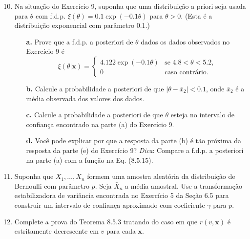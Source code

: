 \begin{enumerate}
    \setcounter{enumi}{9} %
    \item Na situação do Exercício 9, suponha que uma distribuição a priori seja usada para $\theta$ com f.d.p. $\xi(\theta) = 0.1 \exp(-0.1\theta)$ para $\theta > 0$. (Esta é a distribuição exponencial com parâmetro 0.1.)
    \begin{enumerate}
        \item[\textbf{a.}] Prove que a f.d.p. a posteriori de $\theta$ dados os dados observados no Exercício 9 é
        $$ \xi(\theta|\mathbf{x}) = \begin{cases} 4.122 \exp(-0.1\theta) & \text{se } 4.8 < \theta < 5.2, \\ 0 & \text{caso contrário.} \end{cases} $$
        \item[\textbf{b.}] Calcule a probabilidade a posteriori de que $|\theta - \bar{x}_2| < 0.1$, onde $\bar{x}_2$ é a média observada dos valores dos dados.
        \item[\textbf{c.}] Calcule a probabilidade a posteriori de que $\theta$ esteja no intervalo de confiança encontrado na parte (a) do Exercício 9.
        \item[\textbf{d.}] Você pode explicar por que a resposta da parte (b) é tão próxima da resposta da parte (e) do Exercício 9? \textit{Dica}: Compare a f.d.p. a posteriori na parte (a) com a função na Eq. (8.5.15).
    \end{enumerate}

    \item Suponha que $X_1, \dots, X_n$ formem uma amostra aleatória da distribuição de Bernoulli com parâmetro $p$. Seja $\bar{X}_n$ a média amostral. Use a transformação estabilizadora de variância encontrada no Exercício 5 da Seção 6.5 para construir um intervalo de confiança aproximado com coeficiente $\gamma$ para $p$.

    \item Complete a prova do Teorema 8.5.3 tratando do caso em que $r(v, \mathbf{x})$ é estritamente decrescente em $v$ para cada $\mathbf{x}$.

\end{enumerate}